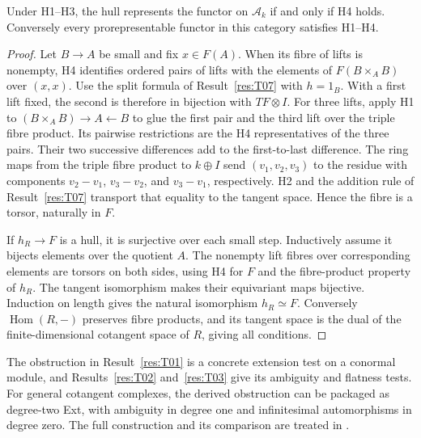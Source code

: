 \begin{theorem}[Prorepresentability]\label{res:T10}
Under H1--H3, the hull represents the functor on \(\mathcal A_k\)
if and only if H4 holds. Conversely every prorepresentable
functor in this category satisfies H1--H4.
\end{theorem}
\begin{proof}
Let \(B\to A\) be small and fix \(x\in F(A)\). When its fibre
of lifts is nonempty, H4 identifies ordered pairs of lifts with
the elements of \(F(B\times_A B)\) over \((x,x)\).
Use the split formula of Result~\ref{res:T07} with \(h=1_B\).
With a first lift fixed, the second is therefore in bijection
with \(TF\otimes I\). For three lifts, apply H1 to
\((B\times_A B)\to A\leftarrow B\) to glue the first pair
and the third lift over the triple fibre product. Its pairwise
restrictions are the H4 representatives of the three pairs.
Their two successive differences add to the first-to-last
difference. The ring maps
from the triple fibre product to \(k\oplus I\) send
\((v_1,v_2,v_3)\) to the residue with components \(v_2-v_1\),
\(v_3-v_2\), and \(v_3-v_1\), respectively. H2 and the addition
rule of Result~\ref{res:T07} transport that equality to the
tangent space. Hence the fibre is a torsor, naturally in \(F\).

If \(h_R\to F\) is a hull, it is surjective over each small step.
Inductively assume it bijects elements over the quotient \(A\).
The nonempty lift fibres over corresponding elements are torsors
on both sides, using H4 for \(F\) and the fibre-product property
of \(h_R\). The tangent isomorphism makes their equivariant
maps bijective. Induction on length gives the natural isomorphism
\(h_R\simeq F\). Conversely \(\operatorname{Hom}(R,-)\) preserves
fibre products, and its tangent space is the dual of the
finite-dimensional cotangent space of \(R\), giving all conditions.
\end{proof}

The obstruction in Result~\ref{res:T01} is a concrete extension
test on a conormal module, and Results~\ref{res:T02} and~\ref{res:T03}
give its ambiguity and flatness tests. For general cotangent
complexes, the derived obstruction can be packaged as degree-two
Ext, with ambiguity in degree one and infinitesimal automorphisms
in degree zero. The full construction and its comparison are
treated in \cite[\S16]{st-cot}.
